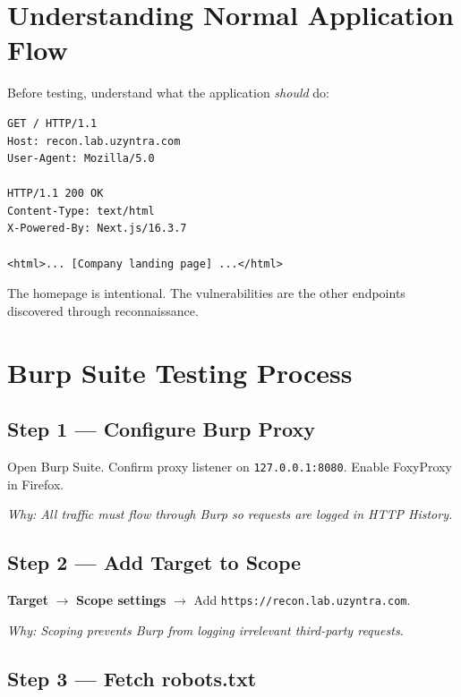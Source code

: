 
\section{Understanding Normal Application Flow}

Before testing, understand what the application \textit{should} do:

\begin{lstlisting}[style=http, caption={Normal request to homepage}]
GET / HTTP/1.1
Host: recon.lab.uzyntra.com
User-Agent: Mozilla/5.0

HTTP/1.1 200 OK
Content-Type: text/html
X-Powered-By: Next.js/16.3.7

<html>... [Company landing page] ...</html>
\end{lstlisting}

The homepage is intentional. The vulnerabilities are the other endpoints discovered through reconnaissance.

\section{Burp Suite Testing Process}

\subsection{Step 1 — Configure Burp Proxy}
Open Burp Suite. Confirm proxy listener on \texttt{127.0.0.1:8080}. Enable FoxyProxy in Firefox.

\textit{Why: All traffic must flow through Burp so requests are logged in HTTP History.}

\subsection{Step 2 — Add Target to Scope}
\textbf{Target} $\to$ \textbf{Scope settings} $\to$ Add \texttt{https://recon.lab.uzyntra.com}.

\textit{Why: Scoping prevents Burp from logging irrelevant third-party requests.}

\subsection{Step 3 — Fetch robots.txt}


